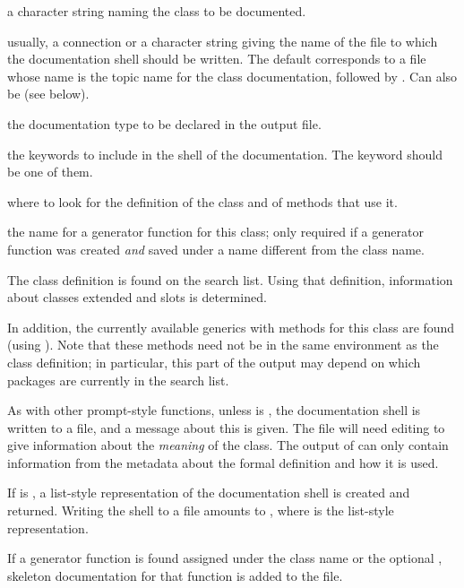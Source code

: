 \begin{Arguments}
\begin{ldescription}
\item[\code{clName}] a character string naming the class to be documented.
\item[\code{filename}] usually, a connection or a character string giving the
name of the file to which the documentation shell should be written.
The default corresponds to a file whose name is the topic name for
the class documentation, followed by .  Can also be
 (see below).
\item[\code{type}] the documentation type to be declared in the output file.
\item[\code{keywords}] the keywords to include in the shell of the
documentation.  The keyword  should be one of
them.
\item[\code{where}] where to look for the definition of the class and of
methods that use it.


\item[\code{generatorName}] the name for a generator function for this
class; only required if a generator function was created
\emph{and} saved under a name different from the class name.

\end{ldescription}
\end{Arguments}
%
\begin{Details}\relax
The class definition is found on the search list.  Using that
definition, information about classes extended and slots is
determined.

In addition, the currently available generics with methods for this
class are found (using ).  Note that these
methods need not be in the same environment as the class definition; in
particular, this part of the output may depend on which packages are
currently in the search list.

As with other prompt-style functions, unless  is
, the documentation shell is written to a file, and a message
about this is given.  The file will need editing to give information
about the \emph{meaning} of the class.  The output of
 can only contain information from the metadata
about the formal definition and how it is used.

If  is , a list-style representation of the
documentation shell is created and returned.  Writing the shell to a
file amounts to ,
where  is the list-style representation.

If a generator function is found assigned under the class name or
the optional , skeleton documentation for that
function is added to the file.
\end{Details}
